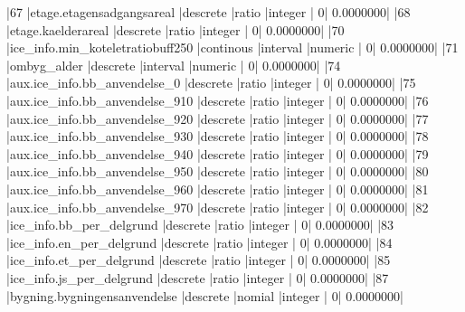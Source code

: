 \documentclass{report}
\begin{document}
\begin{Schunk}
\begin{Soutput}
|67  |etage.etagensadgangsareal                                     |descrete           |ratio          |integer         |              0|          0.0000000|
|68  |etage.kaelderareal                                            |descrete           |ratio          |integer         |              0|          0.0000000|
|70  |ice_info.min_koteletratiobuff250                              |continous          |interval       |numeric         |              0|          0.0000000|
|71  |ombyg_alder                                                   |descrete           |interval       |numeric         |              0|          0.0000000|
|74  |aux.ice_info.bb_anvendelse_0                                  |descrete           |ratio          |integer         |              0|          0.0000000|
|75  |aux.ice_info.bb_anvendelse_910                                |descrete           |ratio          |integer         |              0|          0.0000000|
|76  |aux.ice_info.bb_anvendelse_920                                |descrete           |ratio          |integer         |              0|          0.0000000|
|77  |aux.ice_info.bb_anvendelse_930                                |descrete           |ratio          |integer         |              0|          0.0000000|
|78  |aux.ice_info.bb_anvendelse_940                                |descrete           |ratio          |integer         |              0|          0.0000000|
|79  |aux.ice_info.bb_anvendelse_950                                |descrete           |ratio          |integer         |              0|          0.0000000|
|80  |aux.ice_info.bb_anvendelse_960                                |descrete           |ratio          |integer         |              0|          0.0000000|
|81  |aux.ice_info.bb_anvendelse_970                                |descrete           |ratio          |integer         |              0|          0.0000000|
|82  |ice_info.bb_per_delgrund                                      |descrete           |ratio          |integer         |              0|          0.0000000|
|83  |ice_info.en_per_delgrund                                      |descrete           |ratio          |integer         |              0|          0.0000000|
|84  |ice_info.et_per_delgrund                                      |descrete           |ratio          |integer         |              0|          0.0000000|
|85  |ice_info.js_per_delgrund                                      |descrete           |ratio          |integer         |              0|          0.0000000|
|87  |bygning.bygningensanvendelse                                  |descrete           |nomial         |integer         |              0|          0.0000000|

\end{Soutput}
\end{Schunk}
\end{document}
